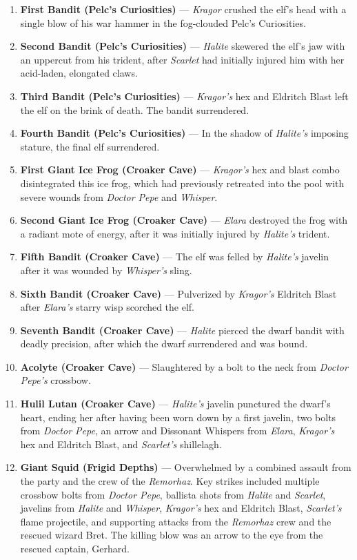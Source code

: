 \documentclass[
  letterpaper,12pt,twoside,twocolumn,openany,
  nodeprecatedcode,bg=full]{dndbook}
\begin{document}
\begin{enumerate}
\def\labelenumi{\arabic{enumi}.}
\item
  \textbf{First Bandit (Pelc's Curiosities)} --- \emph{Kragor} crushed
  the elf's head with a single blow of his war hammer in the fog-clouded
  Pelc's Curiosities.
\item
  \textbf{Second Bandit (Pelc's Curiosities)} --- \emph{Halite} skewered
  the elf's jaw with an uppercut from his trident, after \emph{Scarlet}
  had initially injured him with her acid-laden, elongated claws.
\item
  \textbf{Third Bandit (Pelc's Curiosities)} --- \emph{Kragor's} hex and
  Eldritch Blast left the elf on the brink of death. The bandit
  surrendered.
\item
  \textbf{Fourth Bandit (Pelc's Curiosities)} --- In the shadow of
  \emph{Halite's} imposing stature, the final elf surrendered.
\item
  \textbf{First Giant Ice Frog (Croaker Cave)} --- \emph{Kragor's} hex
  and blast combo disintegrated this ice frog, which had previously
  retreated into the pool with severe wounds from \emph{Doctor Pepe} and
  \emph{Whisper}.
\item
  \textbf{Second Giant Ice Frog (Croaker Cave)} --- \emph{Elara}
  destroyed the frog with a radiant mote of energy, after it was
  initially injured by \emph{Halite's} trident.
\item
  \textbf{Fifth Bandit (Croaker Cave)} --- The elf was felled by
  \emph{Halite's} javelin after it was wounded by \emph{Whisper's}
  sling.
\item
  \textbf{Sixth Bandit (Croaker Cave)} --- Pulverized by \emph{Kragor's}
  Eldritch Blast after \emph{Elara's} starry wisp scorched the elf.
\item
  \textbf{Seventh Bandit (Croaker Cave)} --- \emph{Halite} pierced the
  dwarf bandit with deadly precision, after which the dwarf surrendered
  and was bound.
\item
  \textbf{Acolyte (Croaker Cave)} --- Slaughtered by a bolt to the neck
  from \emph{Doctor Pepe's} crossbow.
\item
  \textbf{Hulil Lutan (Croaker Cave)} --- \emph{Halite's} javelin
  punctured the dwarf's heart, ending her after having been worn down by
  a first javelin, two bolts from \emph{Doctor Pepe}, an arrow and
  Dissonant Whispers from \emph{Elara}, \emph{Kragor's} hex and Eldritch
  Blast, and \emph{Scarlet's} shillelagh.
\item
  \textbf{Giant Squid (Frigid Depths)} --- Overwhelmed by a combined
  assault from the party and the crew of the \emph{Remorhaz}. Key
  strikes included multiple crossbow bolts from \emph{Doctor Pepe},
  ballista shots from \emph{Halite} and \emph{Scarlet}, javelins from
  \emph{Halite} and \emph{Whisper}, \emph{Kragor's} hex and Eldritch
  Blast, \emph{Scarlet's} flame projectile, and supporting attacks from
  the \emph{Remorhaz} crew and the rescued wizard Bret. The killing blow
  was an arrow to the eye from the rescued captain, Gerhard.
\end{enumerate}
\end{document}
